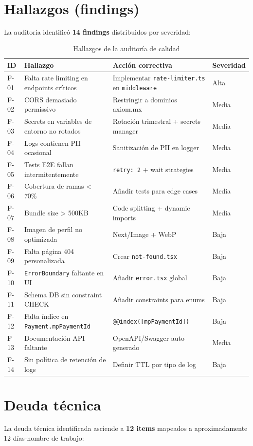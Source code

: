 \documentclass[10pt,a4paper,oneside]{report}
\begin{document}
\section{Hallazgos (findings)}
La auditoría identificó \textbf{14 findings} distribuidos por severidad:

\begin{table}[H]
\centering
\begin{tabular}{p{1.5cm}p{5cm}p{5cm}p{2cm}}
\toprule
\textbf{ID} & \textbf{Hallazgo} & \textbf{Acción correctiva} & \textbf{Severidad} \\
\midrule
F-01 & Falta rate limiting en endpoints críticos & Implementar \texttt{rate-limiter.ts} en \texttt{middleware} & Alta \\
F-02 & CORS demasiado permissivo & Restringir a dominios axiom.mx & Media \\
F-03 & Secrets en variables de entorno no rotados & Rotación trimestral + secrets manager & Media \\
F-04 & Logs contienen PII ocasional & Sanitización de PII en logger & Media \\
F-05 & Tests E2E fallan intermitentemente & \texttt{retry: 2} + wait strategies & Media \\
F-06 & Cobertura de ramas < 70\% & Añadir tests para edge cases & Media \\
F-07 & Bundle size > 500KB & Code splitting + dynamic imports & Media \\
F-08 & Imagen de perfil no optimizada & Next/Image + WebP & Baja \\
F-09 & Falta página 404 personalizada & Crear \texttt{not-found.tsx} & Baja \\
F-10 & \texttt{ErrorBoundary} faltante en UI & Añadir \texttt{error.tsx} global & Baja \\
F-11 & Schema DB sin constraint CHECK & Añadir constraints para enums & Baja \\
F-12 & Falta índice en \texttt{Payment.mpPaymentId} & \texttt{@@index([mpPaymentId])} & Baja \\
F-13 & Documentación API faltante & OpenAPI/Swagger auto-generado & Media \\
F-14 & Sin política de retención de logs & Definir TTL por tipo de log & Baja \\
\bottomrule
\end{tabular}
\caption{Hallazgos de la auditoría de calidad}
\end{table}

\section{Deuda técnica}
La deuda técnica identificada asciende a \textbf{12 items} mapeados a aproximadamente 12 días-hombre de trabajo:
\end{document}
